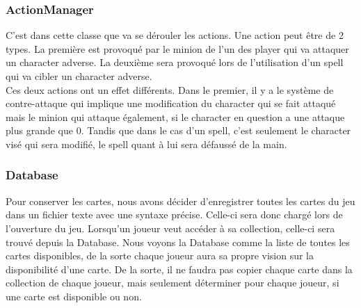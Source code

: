 \subsubsection{ActionManager}
{\noindent C'est dans cette classe que va se dérouler les actions. Une action peut être de 2 types. La première est provoqué par le {minion} de l'un des player qui va attaquer un character adverse. La deuxième sera provoqué lors de l'utilisation d'un {spell} qui va cibler un character adverse.\\
Ces deux actions ont un effet différents. Dans le premier, il y a le système de {contre-attaque} qui implique une modification du character qui se fait attaqué mais le {minion} qui attaque également, si le character en question a une attaque plus grande que 0. Tandis que dans le cas d'un {spell}, c'est seulement le character visé qui sera modifié, le {spell} quant à lui sera défaussé de la main.}
\subsubsection{Database}
{\noindent Pour conserver les cartes, nous avons décider d'enregistrer toutes les cartes du jeu dans un fichier texte avec une syntaxe précise. Celle-ci sera donc chargé lors de l'ouverture du jeu. Lorsqu'un joueur veut accéder à sa collection, celle-ci sera trouvé depuis la Database. Nous voyons la Database comme la liste de toutes les cartes disponibles, de la sorte chaque joueur aura sa propre vision sur la disponibilité d'une carte. De la sorte, il ne faudra pas copier chaque carte dans la collection de chaque joueur, mais seulement déterminer pour chaque joueur, si une carte est disponible ou non.}